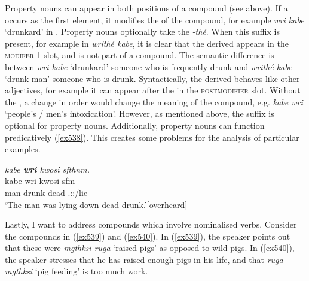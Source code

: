 Property nouns can appear in both positions of a compound (see  above). If a  occurs as the first element, it modifies the  of the compound, for example \emph{wri kabe} `drunkard' in . Property nouns optionally take the  \emph{-thé}. When this suffix is present, for example in \emph{writhé kabe}, it is clear that the derived  appears in the \textsc{modifer-1} slot, and is not part of a compound. The semantic difference is between \emph{wri kabe} `drunkard' \textendash{} someone who is frequently drunk \textendash{} and \emph{writhé kabe} `drunk man' \textendash{} someone who is drunk. Syntactically, the derived  behaves like other adjectives, for example it can appear after the  in the \textsc{postmodifier} slot. Without the , a change in order would change the meaning of the compound, e.g. \emph{kabe wri} `people's / men's intoxication'. However, as mentioned above, the  suffix is optional for property nouns. Additionally, property nouns can function predicatively (\ref{ex538}). This creates some problems for the analysis of particular examples.

\begin{exe}
	\ex \emph{kabe \textbf{wri} kwosi sfthnm.}\\
	\gll kabe wri kwosi sfm\\
	man drunk dead \Tsg.\Masc:\Pst:\Dur{}/lie\\
	\trans `The man was lying down dead drunk.'{\hspace*{1pt}\hfill{\footnotesize{[overheard]}}}
	\label{ex538}
\end{exe}

Lastly, I want to address compounds which involve nominalised verbs. Consider the compounds in (\ref{ex539}) and (\ref{ex540}). In (\ref{ex539}), the speaker points out that these were \emph{mgthksi ruga} `raised pigs' as opposed to wild pigs. In (\ref{ex540}), the speaker stresses that he has raised enough pigs in his life, and that \emph{ruga mgthksi} `pig feeding' is too much work.

